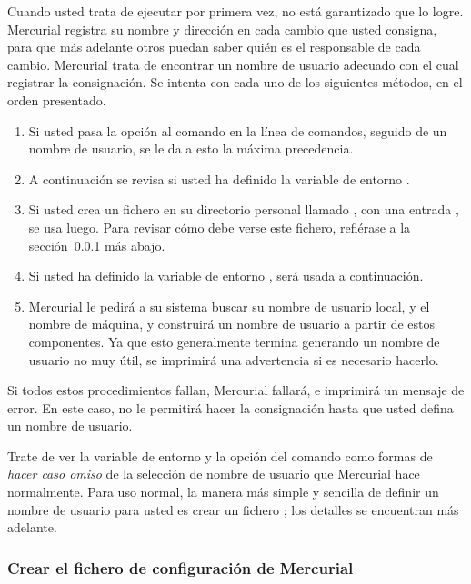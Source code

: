 Cuando usted trata de ejecutar  por primera vez, no está garantizado que lo logre.
Mercurial registra su nombre y dirección en cada cambio que usted
consigna, para que más adelante otros puedan saber quién es el
responsable de cada cambio. Mercurial trata de encontrar un nombre de
usuario adecuado con el cual registrar la consignación. Se intenta con
cada uno de los siguientes métodos, en el orden presentado.
\begin{enumerate}
\item Si usted pasa la opción  al comando 
  en la línea de comandos, seguido de un nombre de usuario, se le da a
  esto la máxima precedencia.
\item A continuación se revisa si usted ha definido la variable de
    entorno .
\item Si usted crea un fichero en su directorio personal llamado
  , con una entrada , se usa
  luego. Para revisar cómo debe verse este fichero, refiérase a la
  sección~\ref{sec:tour-basic:username} más abajo.
\item Si usted ha definido la variable de entorno , será
    usada a continuación.
\item Mercurial le pedirá a su sistema buscar su nombre de usuario
    local, y el nombre de máquina, y construirá un nombre de usuario a
    partir de estos componentes. Ya que esto generalmente termina
    generando un nombre de usuario no muy útil, se imprimirá una
    advertencia si es necesario hacerlo.
\end{enumerate}
Si todos estos procedimientos fallan, Mercurial fallará, e imprimirá
un mensaje de error. En este caso, no le permitirá hacer la
consignación hasta que usted defina un nombre de usuario.

Trate de ver la variable de entorno  y la opción
 del comando  como formas de
\emph{hacer caso omiso} de la selección de nombre de usuario que
Mercurial hace normalmente.  Para uso normal, la manera más simple y
sencilla de definir un nombre de usuario para usted es crear un
fichero ; los detalles se encuentran más adelante.

\subsubsection{Crear el fichero de configuración de Mercurial}
\label{sec:tour-basic:username}

